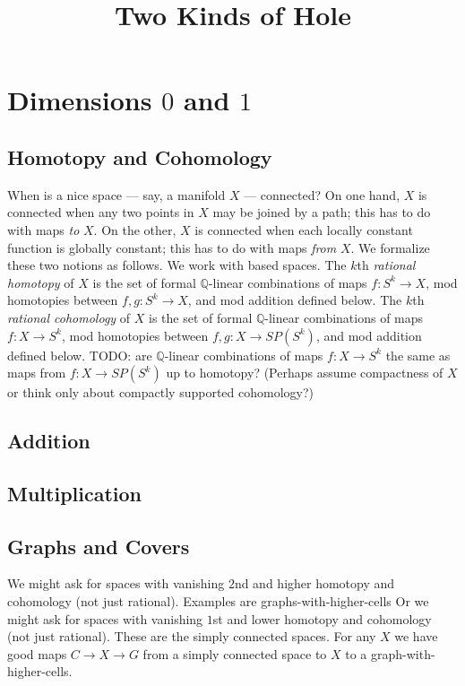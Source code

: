 \documentclass[justified]{tufte-book}
\begin{document}
  \title{Two Kinds of Hole}
  \maketitle

  \setcounter{tocdepth}{1}
  \tableofcontents
  \newpage
  
  \chapter{Dimensions $0$ and $1$}
    \section{Homotopy and Cohomology}
      When is a nice space --- say, a manifold $X$ --- connected?
      On one hand, $X$ is connected when any two points in $X$
      may be joined by a path; this has to do with maps \emph{to} $X$.
      On the other, $X$ is connected when each locally constant
      function is globally constant; this has to do with maps \emph{from} $X$.
      We formalize these two notions as follows.
      We work with based spaces.
      The $k$th \emph{rational homotopy} of $X$ is the
      set of formal $\mathbb{Q}$-linear combinations of maps $f:S^k\to X$, 
      mod homotopies between $f,g:S^k\to X$, and mod addition defined below.
      The $k$th \emph{rational cohomology} of $X$ is the set of formal 
      $\mathbb{Q}$-linear combinations of maps $f:X\to S^k$,
      mod homotopies between $f,g:X\to SP(S^k)$, and mod addition defined below.
      TODO: are $\mathbb{Q}$-linear combinations of maps $f:X\to S^k$ the same as
      maps from $f:X\to SP(S^k)$ up to homotopy?
      (Perhaps assume compactness of $X$ or think only about compactly supported
      cohomology?)
      
    \section{Addition}
    \section{Multiplication}
    \section{Graphs and Covers}
      We might ask for spaces with vanishing $2$nd and higher homotopy
      and cohomology (not just rational).  Examples are graphs-with-higher-cells
      Or we might ask for spaces with vanishing $1$st and lower homotopy
      and cohomology (not just rational).  These are the simply connected
      spaces.  For any $X$ we have good maps $C\to X\to G$ from a simply
      connected space to $X$ to a graph-with-higher-cells.
    
\end{document}
